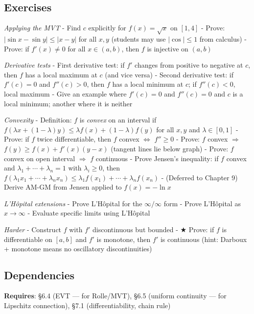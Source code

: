 \documentclass[
  10pt,
  letterpaper,
]{scrbook}
\begin{document}
\subsection{Exercises}\label{exercises-30}

\emph{Applying the MVT} - Find \(c\) explicitly for \(f(x) = \sqrt{x}\)
on \([1, 4]\) - Prove: \(|\sin x - \sin y| \leq |x - y|\) for all
\(x, y\) (students may use \(|\cos| \leq 1\) from calculus) - Prove: if
\(f'(x) \neq 0\) for all \(x \in (a,b)\), then \(f\) is injective on
\((a,b)\)

\emph{Derivative tests} - First derivative test: if \(f'\) changes from
positive to negative at \(c\), then \(f\) has a local maximum at \(c\)
(and vice versa) - Second derivative test: if \(f'(c) = 0\) and
\(f''(c) > 0\), then \(f\) has a local minimum at \(c\); if
\(f''(c) < 0\), local maximum - Give an example where \(f'(c) = 0\) and
\(f''(c) = 0\) and \(c\) is a local minimum; another where it is neither

\emph{Convexity} - Definition: \(f\) is \emph{convex} on an interval if
\(f(\lambda x + (1-\lambda)y) \leq \lambda f(x) + (1-\lambda)f(y)\) for
all \(x, y\) and \(\lambda \in [0,1]\) - Prove: if \(f\) twice
differentiable, then \(f\) convex \(\Longleftrightarrow\) \(f'' \geq 0\)
- Prove: \(f\) convex \(\Longrightarrow\)
\(f(y) \geq f(x) + f'(x)(y - x)\) (tangent lines lie below graph) -
Prove: \(f\) convex on open interval \(\Longrightarrow\) \(f\)
continuous - Prove Jensen's inequality: if \(f\) convex and
\(\lambda_1 + \cdots + \lambda_n = 1\) with \(\lambda_i \geq 0\), then
\(f(\lambda_1 x_1 + \cdots + \lambda_n x_n) \leq \lambda_1 f(x_1) + \cdots + \lambda_n f(x_n)\)
- (Deferred to Chapter 9) Derive AM-GM from Jensen applied to
\(f(x) = -\ln x\)

\emph{L'Hôpital extensions} - Prove L'Hôpital for the \(\infty/\infty\)
form - Prove L'Hôpital as \(x \to \infty\) - Evaluate specific limits
using L'Hôpital

\emph{Harder} - Construct \(f\) with \(f'\) discontinuous but bounded -
★ Prove: if \(f\) is differentiable on \([a,b]\) and \(f'\) is monotone,
then \(f'\) is continuous (hint: Darboux + monotone means no oscillatory
discontinuities)

\subsection{Dependencies}\label{dependencies-30}

\textbf{Requires}: §6.4 (EVT --- for Rolle/MVT), §6.5 (uniform
continuity --- for Lipschitz connection), §7.1 (differentiability, chain
rule)
\end{document}
